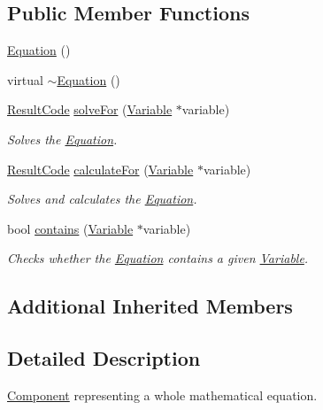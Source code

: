 \subsection*{Public Member Functions}
\begin{DoxyCompactItemize}
\item 
\hyperlink{classkissms_1_1_equation_a222c08c6b55679b4808f7b807ac94184}{Equation} ()
\item 
virtual \hyperlink{classkissms_1_1_equation_ac0c9135b48a8f09ff4ffc0b60cad9c0a}{$\sim$\-Equation} ()
\item 
\hyperlink{namespacekissms_a006cc132ffcae81e38527977e0846e0e}{Result\-Code} \hyperlink{classkissms_1_1_equation_ad2a8ce5aff621d4e19b5042fcedf04de}{solve\-For} (\hyperlink{classkissms_1_1_variable}{Variable} $\ast$variable)
\begin{DoxyCompactList}\small\item\em Solves the \hyperlink{classkissms_1_1_equation}{Equation}. \end{DoxyCompactList}\item 
\hyperlink{namespacekissms_a006cc132ffcae81e38527977e0846e0e}{Result\-Code} \hyperlink{classkissms_1_1_equation_a72474be0471c6190f8cc3d6f5016b115}{calculate\-For} (\hyperlink{classkissms_1_1_variable}{Variable} $\ast$variable)
\begin{DoxyCompactList}\small\item\em Solves and calculates the \hyperlink{classkissms_1_1_equation}{Equation}. \end{DoxyCompactList}\item 
bool \hyperlink{classkissms_1_1_equation_a6f6ded9239ff0a8ec9792e0450d205f1}{contains} (\hyperlink{classkissms_1_1_variable}{Variable} $\ast$variable)
\begin{DoxyCompactList}\small\item\em Checks whether the \hyperlink{classkissms_1_1_equation}{Equation} contains a given \hyperlink{classkissms_1_1_variable}{Variable}. \end{DoxyCompactList}\end{DoxyCompactItemize}
\subsection*{Additional Inherited Members}


\subsection{Detailed Description}
\hyperlink{classkissms_1_1_component}{Component} representing a whole mathematical equation. 

